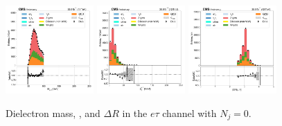 \begin{figure}[htb!]
    \centering
    \includegraphics[width=0.3\textwidth]{chapters/Analysis/sectionPlots/figures/data_mc_overlays/etau_2016_cat_eq0_eq0_signal_linear_lepton_dilepton1_mass}
    \includegraphics[width=0.3\textwidth]{chapters/Analysis/sectionPlots/figures/data_mc_overlays/etau_2016_cat_eq0_eq0_signal_linear_lepton_dilepton1_pt}
    \includegraphics[width=0.3\textwidth]{chapters/Analysis/sectionPlots/figures/data_mc_overlays/etau_2016_cat_eq0_eq0_signal_linear_lepton_dilepton1_delta_r}
    \caption{Dielectron mass, \pt, and $\Delta R$ in the $e\tau$ channel
    with $N_{j} = 0$.}
    \label{fig:analysis:plots:etau_1_dilepton}
\end{figure}


